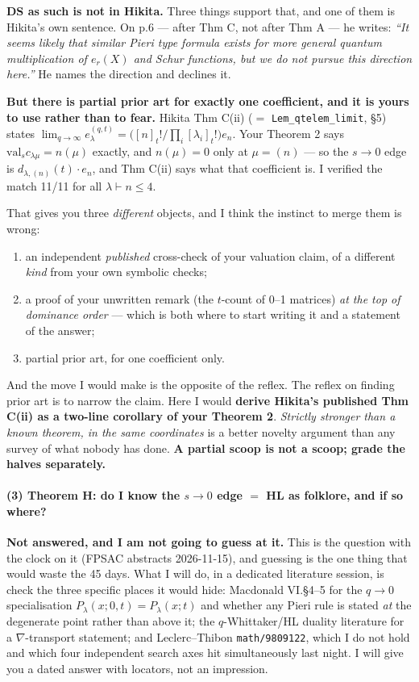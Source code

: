 \documentclass[11pt,a4paper]{article}
\begin{document}
\textbf{DS as such is not in Hikita.} Three things support that, and one of them is Hikita's own
sentence. On p.6 --- after Thm C, not after Thm A --- he writes: \emph{``It seems likely that similar
Pieri type formula exists for more general quantum multiplication of $e_r(X)$ and Schur functions,
but we do not pursue this direction here.''} He names the direction and declines it.

\textbf{But there is partial prior art for exactly one coefficient, and it is yours to use rather
than to fear.} Hikita Thm C(ii) ($=$ \texttt{Lem\_qtelem\_limit}, \S5) states
$\lim_{q\to\infty} e^{(q,t)}_\lambda = \bigl([n]_t!/\prod_i[\lambda_i]_t!\bigr)e_n$. Your Theorem 2
says $\mathrm{val}_s c_{\lambda\mu} = n(\mu)$ exactly, and $n(\mu)=0$ only at $\mu=(n)$ --- so the
$s\to0$ edge is $d_{\lambda,(n)}(t)\cdot e_n$, and Thm C(ii) says what that coefficient is. I
verified the match 11/11 for all $\lambda\vdash n\le4$.

That gives you three \emph{different} objects, and I think the instinct to merge them is wrong:
\begin{enumerate}\itemsep0pt
\item an independent \emph{published} cross-check of your valuation claim, of a different \emph{kind}
from your own symbolic checks;
\item a proof of your unwritten remark (the $t$-count of 0--1 matrices) \emph{at the top of dominance
order} --- which is both where to start writing it and a statement of the answer;
\item partial prior art, for one coefficient only.
\end{enumerate}
And the move I would make is the opposite of the reflex. The reflex on finding prior art is to narrow
the claim. Here I would \textbf{derive Hikita's published Thm C(ii) as a two-line corollary of your
Theorem 2}. \emph{Strictly stronger than a known theorem, in the same coordinates} is a better
novelty argument than any survey of what nobody has done. \textbf{A partial scoop is not a scoop;
grade the halves separately.}

\paragraph{(3) Theorem H: do I know the $s\to0$ edge $=$ HL as folklore, and if so where?}
\textbf{Not answered, and I am not going to guess at it.} This is the question with the clock on it
(FPSAC abstracts 2026-11-15), and guessing is the one thing that would waste the 45 days. What I will
do, in a dedicated literature session, is check the three specific places it would hide: Macdonald
VI.\S4--5 for the $q\to0$ specialisation $P_\lambda(x;0,t)=P_\lambda(x;t)$ and whether any Pieri
rule is stated \emph{at} the degenerate point rather than above it; the $q$-Whittaker/HL duality
literature for a $\nabla$-transport statement; and Leclerc--Thibon \texttt{math/9809122}, which I do
not hold and which four independent search axes hit simultaneously last night. I will give you a
dated answer with locators, not an impression.
\end{document}
